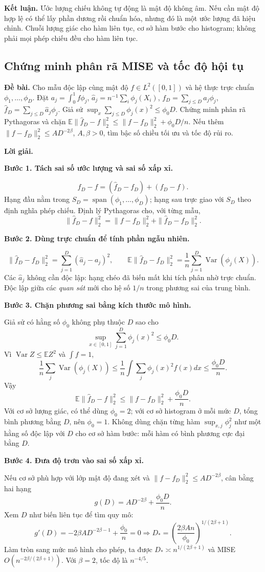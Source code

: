 \documentclass[11pt,a4paper]{article}
\newcommand{\E}{\mathbb E}
\DeclareMathOperator{\Var}{Var}
\newcommand{\buoc}[1]{\par\medskip\textbf{#1}\par}
\begin{document}
\textbf{Kết luận.} Ước lượng chiếu không tự động là mật độ không âm. Nếu cần mật độ hợp lệ có thể lấy phần dương rồi chuẩn hóa, nhưng đó là một ước lượng đã hiệu chỉnh. Chuỗi lượng giác cho hàm liên tục, cơ sở hàm bước cho histogram; không phải mọi phép chiếu đều cho hàm liên tục.

\subsection{Chứng minh phân rã MISE và tốc độ hội tụ}
\textbf{Đề bài.} Cho mẫu độc lập cùng mật độ $f\in L^2([0,1])$ và
hệ thực trực chuẩn $\phi_1,\ldots,\phi_D$.
Đặt $a_j=\int_0^1f\phi_j$, $\widehat a_j=n^{-1}\sum_i\phi_j(X_i)$,
$f_D=\sum_{j\leq D}a_j\phi_j$, $\widehat f_D=\sum_{j\leq D}\widehat a_j\phi_j$.
Giả sử $\sup_x\sum_{j\leq D}\phi_j(x)^2\leq\phi_0D$.
Chứng minh phân rã Pythagoras và chặn
$\E\|\widehat f_D-f\|_2^2\leq\|f-f_D\|_2^2+\phi_0D/n$.
Nếu thêm $\|f-f_D\|_2^2\leq AD^{-2\beta}$, $A,\beta>0$,
tìm bậc số chiều tối ưu và tốc độ rủi ro.

\textbf{Lời giải.}
\buoc{Bước 1. Tách sai số ước lượng và sai số xấp xỉ.}
\[
\widehat f_D-f=(\widehat f_D-f_D)+(f_D-f).
\]
Hạng đầu nằm trong $S_D=\operatorname{span}(\phi_1,\ldots,\phi_D)$; hạng sau trực giao với $S_D$ theo định nghĩa phép chiếu. Định lý Pythagoras cho, với từng mẫu,
\[
\|\widehat f_D-f\|_2^2=\|f-f_D\|_2^2+\|\widehat f_D-f_D\|_2^2.
\]
\buoc{Bước 2. Dùng trực chuẩn để tính phần ngẫu nhiên.}
\[
\|\widehat f_D-f_D\|_2^2=\sum_{j=1}^D(\widehat a_j-a_j)^2,
\qquad
\E\|\widehat f_D-f_D\|_2^2=\frac1n\sum_{j=1}^D\Var(\phi_j(X)).
\]
Các $\widehat a_j$ không cần độc lập: hạng chéo đã biến mất khi tích phân nhờ trực chuẩn. Độc lập giữa các \emph{quan sát} mới cho hệ số $1/n$ trong phương sai của trung bình.
\buoc{Bước 3. Chặn phương sai bằng kích thước mô hình.}
Giả sử có hằng số $\phi_0$ không phụ thuộc $D$ sao cho
\[
\sup_{x\in[0,1]}\sum_{j=1}^D\phi_j(x)^2\leq\phi_0D.
\]
Vì $\Var Z\leq\E Z^2$ và $\int f=1$,
\[
\frac1n\sum_j\Var(\phi_j(X))\leq\frac1n\int\sum_j\phi_j(x)^2f(x)dx
\leq\frac{\phi_0D}{n}.
\]
Vậy
\[
\boxed{\E\|\widehat f_D-f\|_2^2\leq\|f-f_D\|_2^2+\frac{\phi_0D}{n}.}
\]
Với cơ sở lượng giác, có thể dùng $\phi_0=2$; với cơ sở histogram ở mỗi mức $D$, tổng bình phương bằng $D$, nên $\phi_0=1$. Không dùng chặn từng hàm $\sup_{x,j}\phi_j^2$ như một hằng số độc lập với $D$ cho cơ sở hàm bước: mỗi hàm có bình phương cực đại bằng $D$.
\buoc{Bước 4. Đưa độ trơn vào sai số xấp xỉ.}
Nếu cơ sở phù hợp với lớp mật độ đang xét và
$\|f-f_D\|_2^2\leq A D^{-2\beta}$, cân bằng hai hạng
\[
g(D)=AD^{-2\beta}+\frac{\phi_0D}{n}.
\]
Xem $D$ như biến liên tục để tìm quy mô:
\[
g'(D)=-2\beta AD^{-2\beta-1}+\frac{\phi_0}{n}=0
\Longrightarrow D_* =\left(\frac{2\beta An}{\phi_0}\right)^{1/(2\beta+1)}.
\]
Làm tròn sang mức mô hình cho phép, ta được $D_*\asymp n^{1/(2\beta+1)}$ và MISE $O(n^{-2\beta/(2\beta+1)})$. Với $\beta=2$, tốc độ là $n^{-4/5}$.
\end{document}
